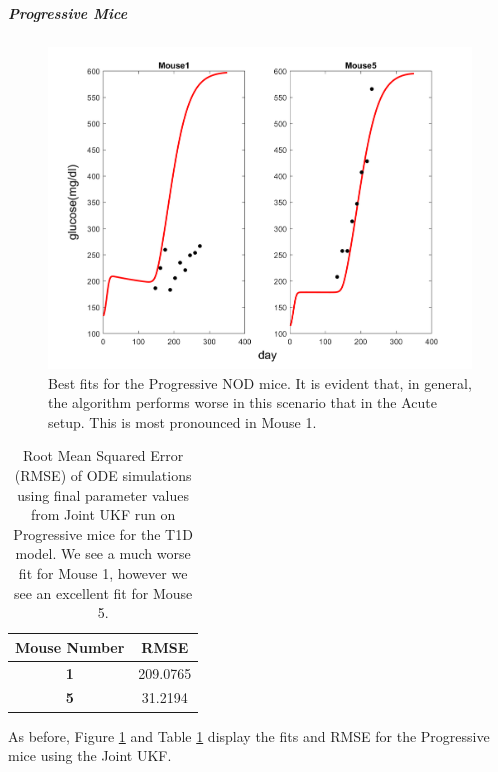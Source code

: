 \subparagraph{Progressive Mice}

\begin{figure}[H]
    \centering
    \includegraphics[width=15cm]{Kalman_Filter_Images/joint_progressive_all.png}
    \caption{Best fits for the Progressive NOD mice. It is evident that, in general, the algorithm performs worse in this scenario that in the Acute setup. This is most pronounced in Mouse 1.}
    \label{fig:T1D_Joint_Progressive_Plots}
\end{figure}

\begin{table}[H]
  \begin{center}

    \begin{tabular}{c|c} %
      \textbf{Mouse Number} & \textbf{RMSE} \\
      \hline
      \textbf{1} & 209.0765\\
      \textbf{5} & 31.2194
    \end{tabular}
    \caption{Root Mean Squared Error (RMSE) of ODE simulations using final parameter values from Joint UKF run on Progressive mice for the T1D model. We see a much worse fit for Mouse 1, however we see an excellent fit for Mouse 5.}
    \label{table:T1D_Joint_Progressive_RMSE}
  \end{center}
\end{table}

As before, Figure \ref{fig:T1D_Joint_Progressive_Plots} and Table \ref{table:T1D_Joint_Progressive_RMSE} display the fits and RMSE for the Progressive mice using the Joint UKF.\\
\\

